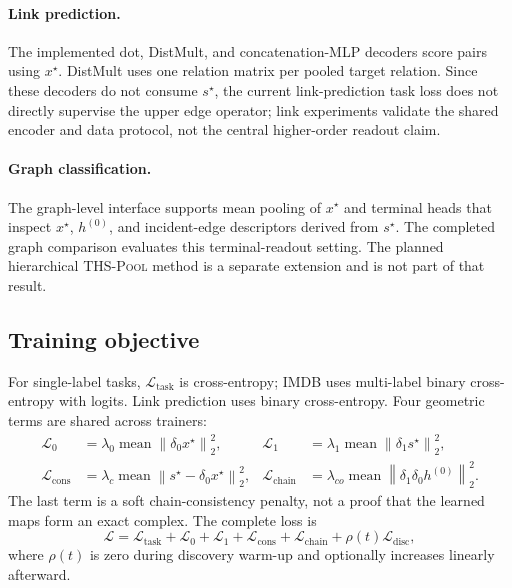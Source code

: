 \documentclass{article}
\newcommand{\thspool}{\textsc{THS-Pool}}
\newcommand{\cL}{\mathcal{L}}
\newcommand{\norm}[1]{\left\lVert #1\right\rVert}
\begin{document}
\paragraph{Link prediction.}
The implemented dot, DistMult, and concatenation-MLP decoders score pairs using $x^\star$.
DistMult uses one relation matrix per pooled target relation. Since these decoders do not consume
$s^\star$, the current link-prediction task loss does not directly supervise the upper edge
operator; link experiments validate the shared encoder and data protocol, not the central
higher-order readout claim.

\paragraph{Graph classification.}
The graph-level interface supports mean pooling of $x^\star$ and terminal heads that inspect
$x^\star$, $h^{(0)}$, and incident-edge descriptors derived from $s^\star$. The completed graph
comparison evaluates this terminal-readout setting. The planned hierarchical \thspool{} method is
a separate extension and is not part of that result.

\subsection{Training objective}

For single-label tasks, $\cL_{\mathrm{task}}$ is cross-entropy; IMDB uses multi-label binary
cross-entropy with logits. Link prediction uses binary cross-entropy. Four geometric terms are
shared across trainers:
\begin{align}
  \cL_{0} &= \lambda_0\operatorname{mean}\norm{\delta_0x^\star}_2^2, &
  \cL_{1} &= \lambda_1\operatorname{mean}\norm{\delta_1s^\star}_2^2,\\
  \cL_{\mathrm{cons}} &= \lambda_c\operatorname{mean}\norm{s^\star-\delta_0x^\star}_2^2, &
  \cL_{\mathrm{chain}} &= \lambda_{co}\operatorname{mean}
  \norm{\delta_1\delta_0h^{(0)}}_2^2.
  \label{eq:regularizers}
\end{align}
The last term is a soft chain-consistency penalty, not a proof that the learned maps form an exact
complex. The complete loss is
\begin{equation}
  \cL=\cL_{\mathrm{task}}+\cL_0+\cL_1+\cL_{\mathrm{cons}}+
  \cL_{\mathrm{chain}}+\rho(t)\cL_{\mathrm{disc}},
  \label{eq:loss}
\end{equation}
where $\rho(t)$ is zero during discovery warm-up and optionally increases linearly afterward.
\end{document}
